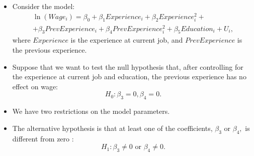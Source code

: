 \documentclass[notes=show,compress,beamer]{beamer}
\begin{document}
\begin{frame}[shrink]%


\begin{itemize}
\item Consider the model:%
\begin{multline*}
\ln \left( Wage_{i}\right) =\beta _{0}+\beta _{1}Experience_{i}+\beta
_{2}Experience_{i}^{2}+ \\
+\beta _{3}PrevExperience_{i}+\beta _{4}PrevExperience_{i}^{2}+\beta
_{5}Education_{i}+U_{i},
\end{multline*}%
where $Experience$ is the experience at current job, and $PrevExperience$ is
the previous experience.%
\pause%

\item Suppose that we want to test the null hypothesis that, after
controlling for the experience at current job and education, the previous
experience has no effect on wage:%
\pause%
\begin{equation*}
H_{0}:\beta _{3}=0,\beta _{4}=0.
\end{equation*}%
\pause%

\item We have 
\color{blue}%
two 
\color{black}
restrictions on the model parameters.%
\pause%

\item The alternative hypothesis is that at least one of the coefficients, $%
\beta _{3}$ or $\beta _{4},$ is different from zero%
\pause%
:%
\begin{equation*}
H_{1}:\beta _{3}\neq 0\text{ or }\beta _{4}\neq 0.
\end{equation*}
\end{itemize}

\end{frame}%
\end{document}
